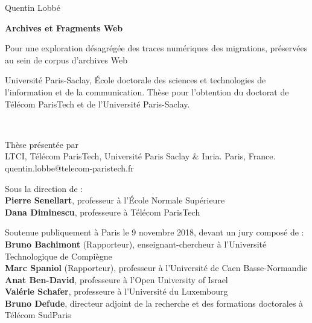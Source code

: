 \documentclass[symmetric,justified,marginals=raggedouter]{tufte-book}
\newcommand{\blankpage}{\newpage\hbox{}\thispagestyle{empty}\newpage}
\begin{document}
\frontmatter


\newpage
\author{Quentin Lobbé}
\title{}
\cleardoublepage
{  
  \begin{fullwidth}%
  \thispagestyle{empty} 
  \setlength{\parskip}{\baselineskip}
  \begingroup
  \vspace*{10em}
  \par\noindent\Large{Quentin Lobbé}
  \vspace*{-1em}
  \par\noindent\Huge\textbf{Archives et Fragments Web}
  \par\noindent\nohyphenation\Large{Pour une exploration désagrégée des traces numériques des migrations, préservées au sein de corpus d'archives Web}
  \endgroup
  \vfill  
  \par\noindent\nohyphenation Université Paris-Saclay, École doctorale des sciences et technologies de l'information et de la communication.  Thèse pour l'obtention du doctorat de Télécom ParisTech et de l'Université Paris-Saclay.    
  \end{fullwidth}%
}

\blankpage

  
\newpage
\begin{fullwidth}
~\vfill
\thispagestyle{empty}
\setlength{\parskip}{\baselineskip}

\par\noindent Thèse présentée par \textbf{\thanklessauthor}\\
LTCI, Télécom ParisTech, Université Paris Saclay \& Inria. Paris, France.\\
quentin.lobbe@telecom-paristech.fr

\par\noindent Sous la direction de :\\
\textbf{Pierre Senellart}, professeur à l'École Normale Supérieure\\
\textbf{Dana Diminescu}, professeure à Télécom ParisTech

\par\noindent Soutenue publiquement à Paris le 9 novembre 2018, devant un jury composé de :\\
\textbf{Bruno Bachimont} (Rapporteur), enseignant-chercheur à l'Université Technologique de Compiègne\\
\textbf{Marc Spaniol} (Rapporteur), professeur à l'Université de Caen Basse-Normandie\\
\textbf{Anat Ben-David}, professeure à l'Open University of Israel\\
\textbf{Valérie Schafer}, professeure à l'Université du Luxembourg\\
\textbf{Bruno Defude}, directeur adjoint de la recherche et des formations doctorales à Télécom SudParis


\end{fullwidth}
  
\end{document}
